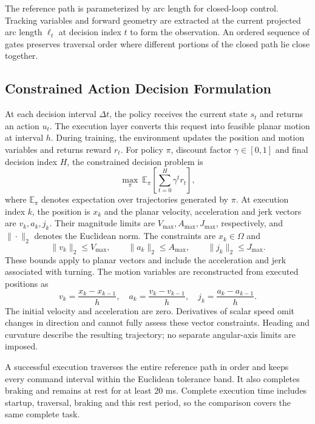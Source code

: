 \documentclass[pdflatex,sn-apa]{sn-jnl}
\begin{document}
The reference path is parameterized by arc length for closed-loop control. Tracking variables and forward geometry are extracted at the current projected arc length $\ell_t$ at decision index $t$ to form the observation. An ordered sequence of gates preserves traversal order where different portions of the closed path lie close together.

\subsection{Constrained Action Decision Formulation}
At each decision interval $\Delta t$, the policy receives the current state $s_t$ and returns an action $u_t$. The execution layer converts this request into feasible planar motion at interval $h$. During training, the environment updates the position and motion variables and returns reward $r_t$. For policy $\pi$, discount factor $\gamma\in[0,1]$ and final decision index $H$, the constrained decision problem is
\begin{equation}
\max_{\pi}\ \mathbb{E}_{\pi}\!\left[\sum_{t=0}^{H}\gamma^t r_t\right],
\end{equation}
where $\mathbb{E}_{\pi}$ denotes expectation over trajectories generated by $\pi$. At execution index $k$, the position is $x_k$ and the planar velocity, acceleration and jerk vectors are $v_k,a_k,j_k$. Their magnitude limits are $V_{\max},A_{\max},J_{\max}$, respectively, and $\|\cdot\|_2$ denotes the Euclidean norm. The constraints are $x_k\in\Omega$ and
\begin{equation}
\|v_k\|_2\leq V_{\max},\qquad \|a_k\|_2\leq A_{\max},\qquad \|j_k\|_2\leq J_{\max}.
\end{equation}
These bounds apply to planar vectors and include the acceleration and jerk associated with turning. The motion variables are reconstructed from executed positions as
\begin{equation}
v_k=\frac{x_k-x_{k-1}}{h},\quad a_k=\frac{v_k-v_{k-1}}{h},\quad j_k=\frac{a_k-a_{k-1}}{h}.
\label{eq:physical_differences}
\end{equation}
The initial velocity and acceleration are zero. Derivatives of scalar speed omit changes in direction and cannot fully assess these vector constraints. Heading and curvature describe the resulting trajectory; no separate angular-axis limits are imposed.

A successful execution traverses the entire reference path in order and keeps every command interval within the Euclidean tolerance band. It also completes braking and remains at rest for at least 20 ms. Complete execution time includes startup, traversal, braking and this rest period, so the comparison covers the same complete task.
\end{document}
